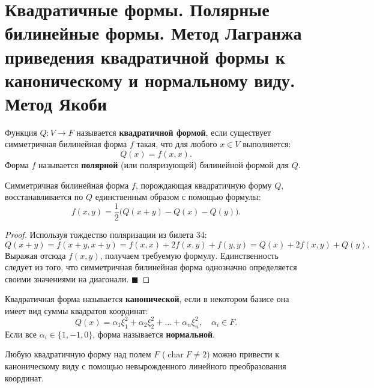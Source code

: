 \section{Квадратичные формы. Полярные билинейные формы. Метод Лагранжа приведения квадратичной формы к каноническому и нормальному виду. Метод Якоби}

\begin{definition}
Функция $Q: V \to F$ называется \textbf{квадратичной формой}, если существует симметричная билинейная форма $f$ такая, что для любого $x \in V$ выполняется:
\[
Q(x) = f(x, x).
\]
Форма $f$ называется \textbf{полярной} (или поляризующей) билинейной формой для $Q$.
\end{definition}

\begin{theorem}
Симметричная билинейная форма $f$, порождающая квадратичную форму $Q$, восстанавливается по $Q$ единственным образом с помощью формулы:
\[
f(x, y) = \frac{1}{2} \big( Q(x+y) - Q(x) - Q(y) \big).
\]
\end{theorem}

\begin{proof}
Используя тождество поляризации из билета 34:
\[
Q(x+y) = f(x+y, x+y) = f(x, x) + 2f(x, y) + f(y, y) = Q(x) + 2f(x, y) + Q(y).
\]
Выражая отсюда $f(x, y)$, получаем требуемую формулу. Единственность следует из того, что симметричная билинейная форма однозначно определяется своими значениями на диагонали.
\hfill$\blacksquare$
\end{proof}

\begin{definition}
Квадратичная форма называется \textbf{канонической}, если в некотором базисе она имеет вид суммы квадратов координат:
\[
Q(x) = \alpha_1 \xi_1^2 + \alpha_2 \xi_2^2 + \dots + \alpha_n \xi_n^2, \quad \alpha_i \in F.
\]
Если все $\alpha_i \in \{1, -1, 0\}$, форма называется \textbf{нормальной}.
\end{definition}

\begin{theorem}
Любую квадратичную форму над полем $F$ ($\operatorname{char} F \neq 2$) можно привести к каноническому виду с помощью невырожденного линейного преобразования координат.
\end{theorem}

